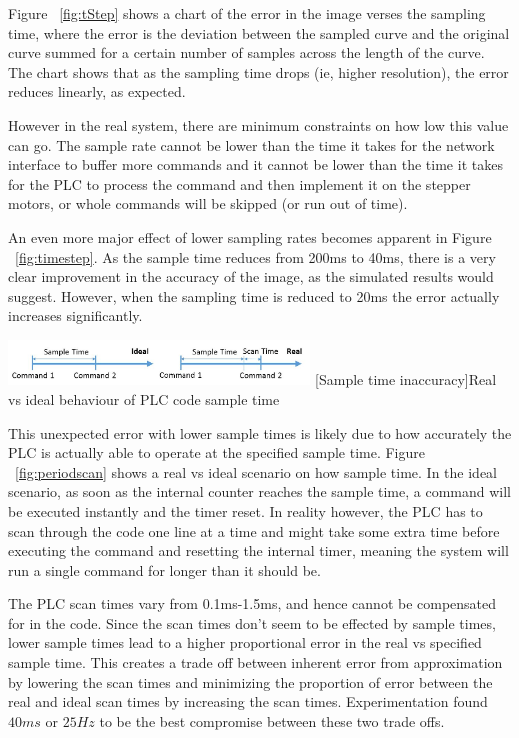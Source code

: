 Figure ~\ref{fig:tStep} shows a chart of the error in the image verses the sampling time, where the error is the deviation between the sampled curve and the original curve summed for a certain number of samples across the length of the curve. The chart shows that as the sampling time drops (ie, higher resolution), the error reduces linearly, as expected.

However in the real system, there are minimum constraints on how low this value can go. The sample rate cannot be lower than the time it takes for the network interface to buffer more commands and it cannot be lower than the time it takes for the PLC to process the command and then implement it on the stepper motors, or whole commands will be skipped (or run out of time). 



An even more major effect of lower sampling rates becomes apparent in Figure ~\ref{fig:timestep}. As the sample time reduces from 200ms to 40ms, there is a very clear improvement in the accuracy of the image, as the simulated results would suggest. However, when the sampling time is reduced to 20ms the error actually increases significantly. 

\begin{center}
\centering
\includegraphics[width=0.6\textwidth]{figures/performance/images/periodscan.jpg}
[Sample time inaccuracy]{Real vs ideal behaviour of PLC code sample time}
\label{fig:periodscan}
\end{center}

This unexpected error with lower sample times is likely due to how accurately the PLC is actually able to operate at the specified sample time. Figure ~\ref{fig:periodscan} shows a real vs ideal scenario on how sample time. In the ideal scenario, as soon as the internal counter reaches the sample time, a command will be executed instantly and the timer reset. In reality however, the PLC has to scan through the code one line at a time and might take some extra time before executing the command and resetting the internal timer, meaning the system will run a single command for longer than it should be. 

The PLC scan times vary from 0.1ms-1.5ms, and hence cannot be compensated for in the code. Since the scan times don't seem to be effected by sample times, lower sample times lead to a higher proportional error in the real vs specified sample time. This creates a trade off between inherent error from approximation by lowering the scan times and minimizing the proportion of error between the real and ideal scan times by increasing the scan times. Experimentation found $40ms$ or $25Hz$ to be the best compromise between these two trade offs. 



